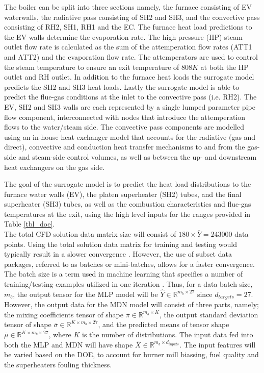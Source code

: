 \documentclass[a4paper,fleqn]{cas-sc}
\begin{document}
The boiler can be split into three sections namely, the furnace consisting of EV waterwalls, the radiative pass consisting of SH2 and SH3, and the convective pass consisting of RH2, SH1, RH1 and the EC. The furnace heat load predictions to the EV walls determine the evaporation rate. The high pressure (HP) steam outlet flow rate is calculated as the sum of the attemperation flow rates (ATT1 and ATT2) and the evaporation flow rate. The attemperators are used to control the steam temperature to ensure an exit temperature of $808K$ at both the HP outlet and RH outlet. In addition to the furnace heat loads the surrogate model predicts the SH2 and SH3 heat loads. Lastly the surrogate model is able to predict the flue-gas conditions at the inlet to the convective pass (i.e. RH2). The EV, SH2 and SH3 walls are each represented by a single lumped parameter pipe flow component, interconnected with nodes that introduce the attemperation flows to the water/steam side. The convective pass components are modelled using an in-house heat exchanger model that accounts for the radiative (gas and direct), convective and conduction heat transfer mechanisms to and from the gas-side and steam-side control volumes, as well as between the up- and downstream heat exchangers on the gas side.

The goal of the surrogate model is to predict the heat load distributions to the furnace water walls (EV), the platen superheater (SH2) tubes, and the final superheater (SH3) tubes, as well as the combustion characteristics and flue-gas temperatures at the exit, using the high level inputs for the ranges provided in Table \ref{tbl_doe}.\\

The total CFD solution data matrix size will consist of $180\times\overline{Y}=243000$ data points. Using the total solution data matrix for training and testing would typically result in a slower convergence \cite{goodfellow}. However, the use of subset data packages, referred to as batches or mini-batches, allows for a faster convergence. The batch size is a term used in machine learning that specifies a number of training/testing examples utilized in one iteration \cite{Wheeler2019}. Thus, for a data batch size, $m_b$, the output tensor for the MLP model will be $\hat{Y}\in \mathbb{R}^{m_b\times 27}$ since $d_{targets}=27$. However, the output data for the MDN model will consist of three parts, namely; the mixing coefficients tensor of shape  $\overline{\pi}\in \mathbb{R}^{m_b \times K}$, the output standard deviation tensor of shape $\overline{\sigma}\in \mathbb{R}^{K\times m_b\times 27}$, and the predicted means of tensor shape $\overline{\mu}\in \mathbb{R}^{K\times m_b\times 27}$, where $K$ is the number of distributions. The input data fed into both the MLP and MDN will have shape $\overline{X}\in \mathbb{R}^{m_b\times d_{inputs}}$. The input features will be varied based on the DOE, to account for burner mill biassing, fuel quality and the superheaters fouling thickness.
\end{document}
